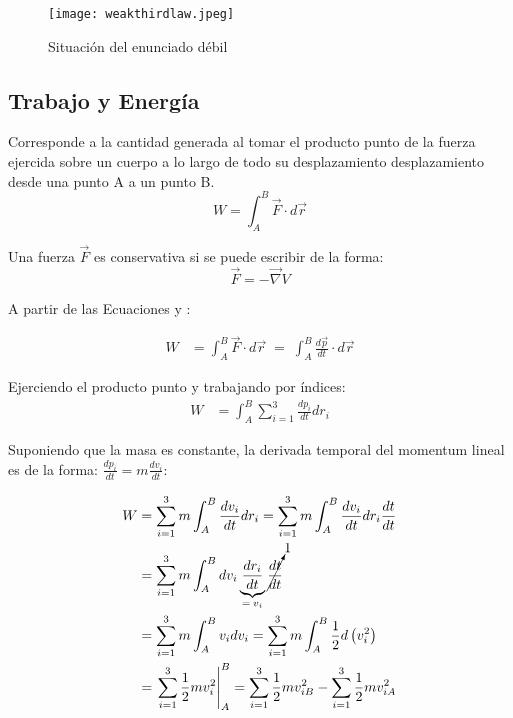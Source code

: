 \documentclass[/home/hernan/Documentos/Apuntes_mecanica_teorica/main.tex]{subfiles}
\begin{document}
	\begin{marginfigure}
		\begin{figure}[H]
			\centering
			\texttt{[image: weakthirdlaw.jpeg]}
			\caption{Situación del enunciado débil}
			\label{fig: Nthirdweak}
		\end{figure}
	\end{marginfigure}

	\subsection{Trabajo y Energía}

	\begin{definition} Corresponde a la cantidad generada al tomar el producto punto de la fuerza ejercida sobre un cuerpo a lo largo de todo su desplazamiento desplazamiento desde una punto A a un punto B.
		\begin{equation}
			W = \int_{A}^{B} \vec{F} \cdot d\vec{r}
			\label{eq: work}
		\end{equation}
	\end{definition}

	\begin{definition} Una fuerza $\vec{F}$ es conservativa si se puede escribir de la forma:
		\begin{equation}
			\vec{F} = - \vec{\nabla}V
			\label{eq: conservativeforce}
		\end{equation}
	\end{definition}

	A partir de las Ecuaciones  y :

	\begin{align*}
		W & = \int_{A}^{B} \vec{F} \cdot d\vec{r} \; = \; \int_{A}^{B}  \frac{d \vec{p}}{dt} \cdot d\vec{r}
	\end{align*}

	Ejerciendo el producto punto y trabajando por índices:
	\begin{align*}
		W & = \int_{A}^{B} \sum_{i=1}^{3} \frac{d p_{i}}{dt}dr_{i}
	\end{align*}

	Suponiendo que la masa es constante, la derivada temporal del momentum lineal es de la forma: $\frac{d p_{i}}{dt} = m \frac{d v_{i}}{dt}$:

	\begin{align*}
		W & =  \sum_{i=1}^{3} m \int_{A}^{B} \frac{d v_{i}}{dt}dr_{i} =  \sum_{i=1}^{3} m \int_{A}^{B} \frac{d v_{i}}{dt}dr_{i} \frac{dt}{dt}\\ 
		& = \sum_{i=1}^{3} m \int_{A}^{B} d v_{i} \underbrace{\frac{d r_{i}}{dt}}_{= \: v_{i}} \cancelto{1}{\frac{dt}{dt}}\\
		& = \sum_{i=1}^{3} m \int_{A}^{B}  v_{i} d v_{i} =  \sum_{i=1}^{3} m \int_{A}^{B} \frac{1}{2} d \left(v_{i}^{2}\right)\\
		& = \left . \sum_{i=1}^{3} \frac{1}{2} m v_{i}^{2} \right|_{A} ^{B} = \sum_{i=1}^{3} \frac{1}{2} m v_{iB}^{2} - \sum_{i=1}^{3} \frac{1}{2} m v_{iA}^{2}
	\end{align*}
\end{document}
